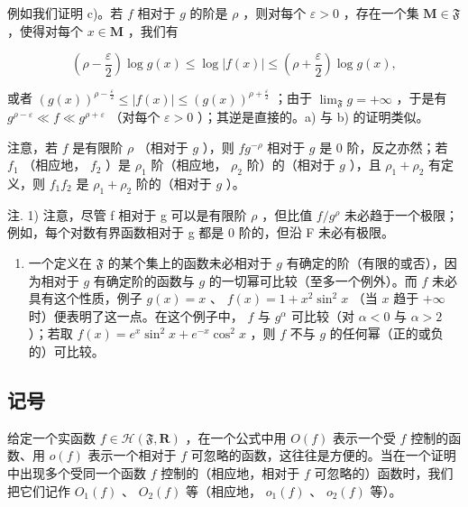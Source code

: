 例如我们证明 c)。若 \(f\) 相对于 \(g\) 的阶是 \(\rho\) ，则对每个 \(\varepsilon > 0\) ，存在一个集 \(\mathbf{M} \in \mathfrak{F}\) ，使得对每个 \(x \in \mathbf{M}\) ，我们有

\[
\left(\rho - \frac {\varepsilon}{2}\right) \log g (x) \leqslant \log | f (x) | \leqslant \left(\rho + \frac {\varepsilon}{2}\right) \log g (x),
\]

或者 \((g(x))^{\rho-\frac{\varepsilon}{2}} \leqslant |f(x)| \leqslant (g(x))^{\rho+\frac{\varepsilon}{2}}\) ；由于 \(\lim_{\mathfrak{F}} g = +\infty\) ，于是有 \(g^{\rho-\varepsilon} \ll f \ll g^{\rho+\varepsilon}\) （对每个 \(\varepsilon > 0\) ）；其逆是直接的。a) 与 b) 的证明类似。

注意，若 \(f\) 是有限阶 \(\rho\) （相对于 \(g\) ），则 \(fg^{-\rho}\) 相对于 \(g\) 是 0 阶，反之亦然；若 \(f_1\) （相应地， \(f_2\) ）是 \(\rho_1\) 阶（相应地， \(\rho_2\) 阶）的（相对于 \(g\) ），且 \(\rho_1 + \rho_2\) 有定义，则 \(f_1f_2\) 是 \(\rho_1 + \rho_2\) 阶的（相对于 \(g\) ）。

注. 1) 注意，尽管 f 相对于 g 可以是有限阶 \(\rho\) ，但比值 \(f/g^{\rho}\) 未必趋于一个极限；例如，每个对数有界函数相对于 g 都是 0 阶的，但沿 F 未必有极限。

\begin{enumerate}
\def\labelenumi{\arabic{enumi})}
\setcounter{enumi}{1}
\tightlist
\item
  一个定义在 \(\mathfrak{F}\) 的某个集上的函数未必相对于 \(g\) 有确定的阶（有限的或否），因为相对于 \(g\) 有确定阶的函数与 \(g\) 的一切幂可比较（至多一个例外）。而 \(f\) 未必具有这个性质，例子 \(g(x) = x\) 、 \(f(x) = 1 + x^2 \sin^2 x\) （当 \(x\) 趋于 \(+\infty\) 时）便表明了这一点。在这个例子中， \(f\) 与 \(g^\alpha\) 可比较（对 \(\alpha < 0\) 与 \(\alpha > 2\) ）；若取 \(f(x) = e^x \sin^2 x + e^{-x} \cos^2 x\) ，则 \(f\) 不与 \(g\) 的任何幂（正的或负的）可比较。
\end{enumerate}

\subsection{记号}

给定一个实函数 \(f \in \mathcal{H}(\mathfrak{F}, \mathbf{R})\) ，在一个公式中用 \(O(f)\) 表示一个受 \(f\) 控制的函数、用 \(o(f)\) 表示一个相对于 \(f\) 可忽略的函数，这往往是方便的。当在一个证明中出现多个受同一个函数 \(f\) 控制的（相应地，相对于 \(f\) 可忽略的）函数时，我们把它们记作 \(O_1(f)\) 、 \(O_2(f)\) 等（相应地， \(o_1(f)\) 、 \(o_2(f)\) 等）。

